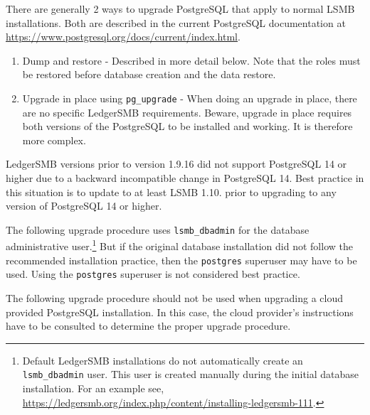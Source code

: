 There are generally 2 ways to upgrade PostgreSQL that apply to normal LSMB installations. 
Both are described in the current PostgreSQL documentation at \url{https://www.postgresql.org/docs/current/index.html}.
\begin{enumerate}
    \item Dump and restore -
        Described in more detail below.
        Note that the roles must be restored before database creation and the data restore.
    \item Upgrade in place using \texttt{pg\_upgrade} - When doing an upgrade in place, there are no specific LedgerSMB requirements.
        Beware, upgrade in place requires both versions of the PostgreSQL to be installed and working. It is therefore more complex.
\end{enumerate}

LedgerSMB versions prior to version 1.9.16 did not support PostgreSQL 14 or higher due to a backward incompatible change in PostgreSQL 14.
Best practice in this situation is to update to at least LSMB 1.10. prior to upgrading to any version of PostgreSQL 14 or higher.

The following upgrade procedure uses \texttt{lsmb\_dbadmin} for the database administrative user.\footnote{Default LedgerSMB installations do not automatically create an  \texttt{lsmb\_dbadmin} user. This user is created manually during the initial database installation. For an example see, \url{https://ledgersmb.org/index.php/content/installing-ledgersmb-111}.}
But if the original database installation did not follow the recommended installation practice, then the \texttt{postgres} superuser may have to be used. Using the \texttt{postgres} superuser is not considered best practice.

The following upgrade procedure should not be used when upgrading a cloud provided PostgreSQL installation.
In this case, the cloud provider's instructions have to be consulted to determine the proper upgrade procedure.

